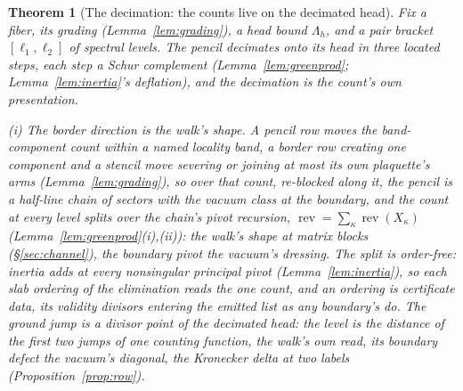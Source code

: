 \documentclass[11pt]{article}
\newtheorem{theorem}{Theorem}
\theoremstyle{definition}
\begin{document}
\begin{theorem}[The decimation: the counts live on the decimated head]
\label{thm:decimation}
Fix a fiber, its grading (Lemma~\ref{lem:grading}), a head bound
$\Lambda_h$, and a pair bracket $[\ell_1,\ell_2]$ of spectral
levels. The pencil decimates onto its head in three located
steps, each step a Schur complement
(Lemma~\ref{lem:greenprod}; Lemma~\ref{lem:inertia}'s deflation),
and the decimation is the count's own presentation.

\emph{(i) The border direction is the walk's shape.} A pencil row moves
the band-component count within a named locality band, a border row creating one
component and a stencil move severing or joining at most its own
plaquette's arms (Lemma~\ref{lem:grading}), so over that count,
re-blocked along it, the pencil is a half-line chain of sectors
with the vacuum class at the boundary, and the count at every level
splits over the chain's pivot recursion,
$\operatorname{rev}=\sum_\kappa\operatorname{rev}(X_\kappa)$
(Lemma~\ref{lem:greenprod}(i),(ii)): the walk's shape at matrix blocks
(\S\ref{sec:channel}), the boundary pivot the vacuum's dressing. The
split is order-free: inertia adds at every nonsingular principal pivot
(Lemma~\ref{lem:inertia}), so each slab ordering of the elimination reads
the one count, and an ordering is certificate data, its validity divisors
entering the emitted list as any boundary's do. The
ground jump is a divisor point of the decimated head: the level is the
distance of the first two jumps of one counting function, the walk's own
read, its boundary defect the vacuum's diagonal, the Kronecker delta
at two labels (Proposition~\ref{prop:row}).


\end{theorem}
\end{document}
